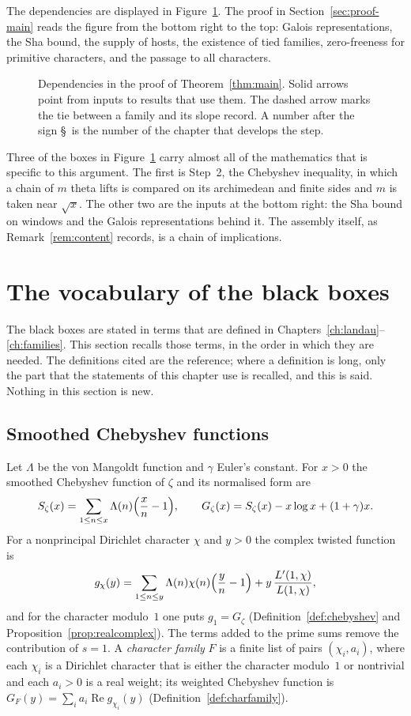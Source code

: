 \documentclass[11pt]{amsbook}
\theoremstyle{plain}
\theoremstyle{definition}
\theoremstyle{remark}
\numberwithin{equation}{section}
\numberwithin{figure}{chapter}
\numberwithin{table}{chapter}
\newcommand{\Gz}{G_{\zeta}}
\newcommand{\Sz}{S_{\zeta}}
\begin{document}
The dependencies are displayed in Figure~\ref{fig:dag}. The proof in
Section~\ref{sec:proof-main} reads the figure from the bottom right
to the top: Galois representations, the Sha bound, the supply of
hosts, the existence of tied families, zero-freeness for primitive
characters, and the passage to all characters.

\begin{figure}[htbp]
\centering

\caption{Dependencies in the proof of Theorem~\ref{thm:main}.
Solid arrows point from inputs to results that use them. The
dashed arrow marks the tie between a family and its slope record.
A number after the sign \S\ is the number of the chapter that
develops the step.}
\label{fig:dag}
\end{figure}

Three of the boxes in Figure~\ref{fig:dag} carry almost all of the
mathematics that is specific to this argument. The first is Step~2,
the Chebyshev inequality, in which a chain of $m$ theta lifts is
compared on its archimedean and finite sides and $m$ is taken near
$\sqrt x$. The other two are the inputs at the bottom right: the
Sha bound on windows and the Galois representations behind it. The
assembly itself, as Remark~\ref{rem:content} records, is a chain of
implications.

\section{The vocabulary of the black boxes}
\label{sec:bb-vocabulary}

The black boxes are stated in terms that are defined in
Chapters~\ref{ch:landau}--\ref{ch:families}. This section recalls
those terms, in the order in which they are needed. The definitions
cited are the reference; where a definition is long, only the part
that the statements of this chapter use is recalled, and this is
said. Nothing in this section is new.

\subsection*{Smoothed Chebyshev functions}

Let $\Lambda$ be the von Mangoldt function and $\gamma$ Euler's
constant. For $x>0$ the smoothed Chebyshev function of $\zeta$ and
its normalised form are
\[
\Sz(x)=\sum_{1\le n\le x}\Lambda(n)\Bigl(\frac xn-1\Bigr),\qquad
\Gz(x)=\Sz(x)-x\log x+(1+\gamma)x .
\]
For a nonprincipal Dirichlet character $\chi$ and $y>0$ the complex
twisted function is
\[
g_\chi(y)=\sum_{1\le n\le y}\Lambda(n)\chi(n)\Bigl(\frac yn-1\Bigr)
+y\,\frac{L'(1,\chi)}{L(1,\chi)},
\]
and for the character modulo~$1$ one puts $g_1=\Gz$
(Definition~\ref{def:chebyshev} and
Proposition~\ref{prop:realcomplex}). The terms added to the prime
sums remove the contribution of $s=1$. A \emph{character family} $F$
is a finite list of pairs $(\chi_i,a_i)$, where each $\chi_i$ is a
Dirichlet character that is either the character modulo~$1$ or
nontrivial and each $a_i>0$ is a real weight; its weighted Chebyshev
function is $G_F(y)=\sum_ia_i\operatorname{Re}g_{\chi_i}(y)$
(Definition~\ref{def:charfamily}).
\end{document}
